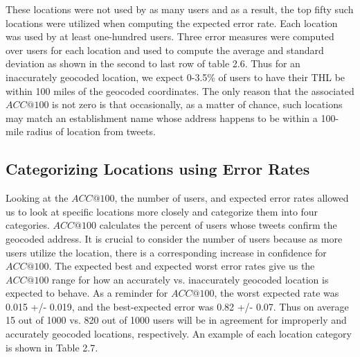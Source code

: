 These locations were not used by as many users and as a result, the top fifty such locations were utilized when computing the expected error rate. Each location was used by at least one-hundred users. Three error measures were computed over users for each location and used to compute the average and standard deviation as shown in the second to last row of table 2.6. Thus for an inaccurately geocoded location, we expect 0-3.5\% of users to have their THL be within 100 miles of the geocoded coordinates. The only reason that the associated $ACC@100$ is not zero is that occasionally, as a matter of chance, such locations may match an establishment name whose address happens to be within a 100-mile radius of location from tweets. 

\subsection{Categorizing Locations using Error Rates}

Looking at the $ACC@100$, the number of users, and expected error rates allowed us to look at specific locations more closely and categorize them into four categories. $ACC@100$ calculates the percent of users whose tweets confirm the geocoded address. It is crucial to consider the number of users because as more users utilize the location, there is a corresponding increase in confidence for $ACC@100$. The expected best and expected worst error rates give us the $ACC@100$ range for how an accurately vs. inaccurately geocoded location is expected to behave. As a reminder for $ACC@100$, the worst expected rate was 0.015 +/- 0.019, and the best-expected error was 0.82 +/- 0.07. Thus on average 15 out of 1000 vs. 820 out of 1000 users will be in agreement for improperly and accurately geocoded locations, respectively. An example of each location category is shown in Table 2.7.

